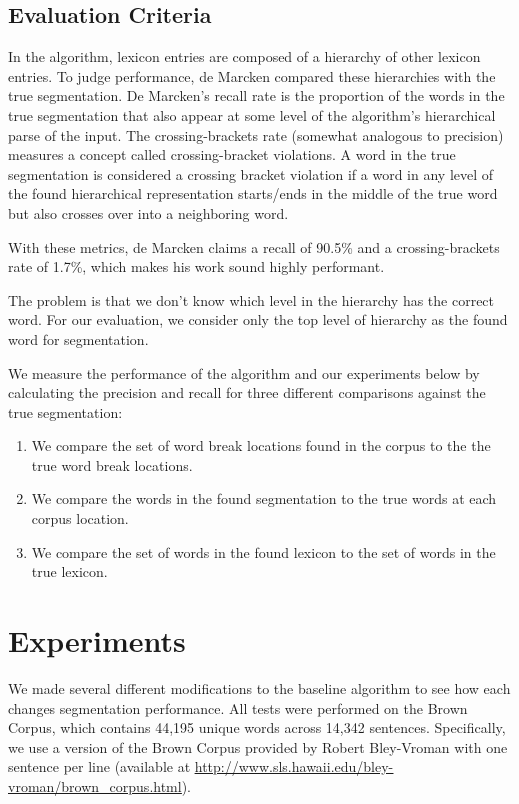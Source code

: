 \documentclass[11pt, oneside, fleqn]{article}
\begin{document}
  \subsection{Evaluation Criteria}

	In the algorithm, lexicon entries are composed of a hierarchy of other lexicon entries. To judge performance, de Marcken compared these hierarchies with the true segmentation. De Marcken's recall rate is the proportion of the words in the true segmentation that also appear at some level of the algorithm's hierarchical parse of the input. The crossing-brackets rate (somewhat analogous to precision) measures a concept called crossing-bracket violations. A word in the true segmentation is considered a crossing bracket violation if a word in any level of the found hierarchical representation starts/ends in the middle of the true word but also crosses over into a neighboring word.

    With these metrics, de Marcken claims a recall of 90.5\% and a crossing-brackets rate of 1.7\%, which makes his work sound highly performant.

	The problem is that we don't know which level in the hierarchy has the correct word. For our evaluation, we consider only the top level of hierarchy as the found word for segmentation.

	We measure the performance of the algorithm and our experiments below by calculating the precision and recall for three different comparisons against the true segmentation:

	\begin{enumerate}
		\item We compare the set of word break locations found in the corpus to the the true word break locations.
		\item We compare the words in the found segmentation to the true words at each corpus location.
		\item We compare the set of words in the found lexicon to the set of words in the true lexicon.
	\end{enumerate}

  \section{Experiments}

  We made several different modifications to the baseline algorithm to see how each changes segmentation performance. All tests were performed on the Brown Corpus,\cite{browncorpus} which contains 44,195 unique words across 14,342 sentences. Specifically, we use a version of the Brown Corpus provided by Robert Bley-Vroman with one sentence per line (available at \href{http://www.sls.hawaii.edu/bley-vroman/brown_corpus.html}{\underline{http://www.sls.hawaii.edu/bley-vroman/brown\_corpus.html}}).
\end{document}
